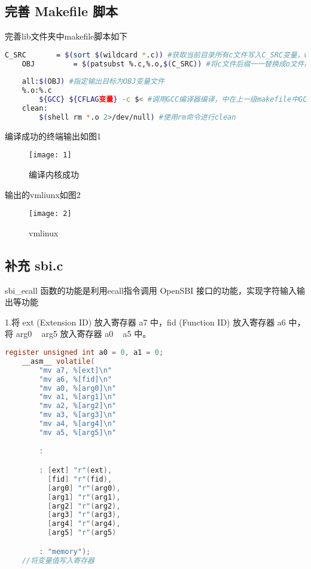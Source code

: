 \documentclass{source/Report}
\begin{document}
\subsection{完善 Makefile 脚本}

完善lib文件夹中makefile脚本如下

\begin{lstlisting}[language = bash, title = {makefile}]
    C_SRC       = $(sort $(wildcard *.c)) #获取当前目录所有c文件写入C_SRC变量，wildcard寻找通配符，sort以首字母排序
    OBJ		    = $(patsubst %.c,%.o,$(C_SRC)) #将c文件后缀一一替换成o文件后缀写入OBJ变量
    
    all:$(OBJ) #指定输出目标为OBJ变量文件
    %.o:%.c
        ${GCC} ${CFLAG变量} -c $< #调用GCC编译器编译，中在上一级makefile中GCC编译器写入GCC变量，参数写入CFLAG变量
    clean:
        $(shell rm *.o 2>/dev/null) #使用rm命令进行clean
\end{lstlisting}

编译成功的终端输出如图1

\begin{figure}[p]
    \centering
    \texttt{[image: 1]}
    \caption{编译内核成功}
\end{figure}

输出的vmliunx如图2

\begin{figure}[p]
    \centering
    \texttt{[image: 2]}
    \caption{vmlinux}
\end{figure}

\subsection{补充 sbi.c}

sbi\_ecall 函数的功能是利用ecall指令调用 OpenSBI 接口的功能，实现字符输入输出等功能

1.将 ext (Extension ID) 放入寄存器 a7 中，fid (Function ID) 放入寄存器 a6 中，将 arg0 ~ arg5 放入寄存器 a0 ~ a5 中。

\begin{lstlisting}[language = c, title = {sbi}]
    register unsigned int a0 = 0, a1 = 0;
	__asm__ volatile(
		"mv a7, %[ext]\n"
		"mv a6, %[fid]\n"
		"mv a0, %[arg0]\n"
		"mv a1, %[arg1]\n"
		"mv a2, %[arg2]\n"
		"mv a3, %[arg3]\n"
		"mv a4, %[arg4]\n"
		"mv a5, %[arg5]\n"

		:

		: [ext] "r"(ext),
		  [fid] "r"(fid),
		  [arg0] "r"(arg0),
		  [arg1] "r"(arg1),
		  [arg2] "r"(arg2),
		  [arg3] "r"(arg3),
		  [arg4] "r"(arg4),
		  [arg5] "r"(arg5)

		: "memory");
	//将变量值写入寄存器
\end{lstlisting}
\end{document}
